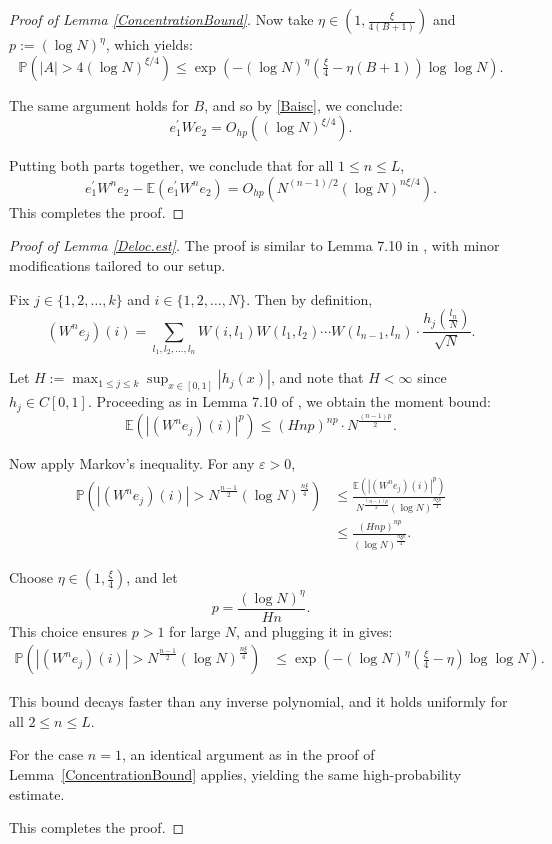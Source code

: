 \documentclass[11pt, reqno]{amsart}
\numberwithin{equation}{section}
\begin{document}
\begin{proof}[Proof of Lemma \ref{ConcentrationBound}]
Now take \( \eta \in \left(1, \frac{\xi}{4(B+1)}\right) \) and \( p := (\log N)^{\eta} \), which yields:
\[
\mathbb{P}(|A| > 4(\log N)^{\xi/4}) \le \exp\left( - (\log N)^{\eta} (\tfrac{\xi}{4} - \eta(B+1)) \log \log N \right).
\]

The same argument holds for \( B \), and so by \eqref{Baisc}, we conclude:
\[
e_1^\prime W e_2 = O_{hp}((\log N)^{\xi/4}).
\]

Putting both parts together, we conclude that for all \( 1 \le n \le L \),
\[
e_1^\prime W^n e_2 - \mathbb{E}(e_1^\prime W^n e_2) = O_{hp}\left( N^{(n-1)/2} (\log N)^{n\xi/4} \right).
\]
This completes the proof.
\end{proof}


\begin{proof}[Proof of Lemma \ref{Deloc.est}]
The proof is similar to Lemma 7.10 in \cite{erdHos2013spectral}, with minor modifications tailored to our setup.

Fix \( j \in \{1,2,\ldots,k\} \) and \( i \in \{1,2,\ldots,N\} \). Then by definition,
\[
(W^n e_j)(i) = \sum_{l_1, l_2, \ldots, l_n} W(i, l_1) W(l_1, l_2) \cdots W(l_{n-1}, l_n) \cdot \frac{h_j\left(\frac{l_n}{N}\right)}{\sqrt{N}}.
\]

Let \( H := \max_{1 \le j \le k} \sup_{x \in [0,1]} |h_j(x)| \), and note that \( H < \infty \) since \( h_j \in C[0,1] \). Proceeding as in Lemma 7.10 of \cite{erdHos2013spectral}, we obtain the moment bound:
\[
\mathbb{E}\left( |(W^n e_j)(i)|^p \right) \le (H n p)^{n p} \cdot N^{\frac{(n-1)p}{2}}.
\]

Now apply Markov's inequality. For any \( \varepsilon > 0 \),
\begin{align*}
\mathbb{P}\left( |(W^n e_j)(i)| > N^{\frac{n-1}{2}} (\log N)^{\frac{n\xi}{4}} \right) 
&\le \frac{ \mathbb{E} \left( |(W^n e_j)(i)|^p \right) }{ N^{\frac{(n-1)p}{2}} (\log N)^{\frac{n\xi p}{4}} } \\
&\le \frac{ (H n p)^{n p} }{ (\log N)^{\frac{n \xi p}{4}} }.
\end{align*}

Choose \( \eta \in \left(1, \frac{\xi}{4} \right) \), and let
\[
p = \frac{ (\log N)^\eta }{H n }.
\]
This choice ensures \( p > 1 \) for large \( N \), and plugging it in gives:
\begin{align*}
\mathbb{P}\left( |(W^n e_j)(i)| > N^{\frac{n-1}{2}} (\log N)^{\frac{n\xi}{4}} \right)
&\le \exp\left( - (\log N)^\eta \left( \frac{\xi}{4} - \eta \right) \log \log N \right).
\end{align*}

This bound decays faster than any inverse polynomial, and it holds uniformly for all \( 2 \le n \le L \).

For the case \( n = 1 \), an identical argument as in the proof of Lemma~\ref{ConcentrationBound} applies, yielding the same high-probability estimate.

\smallskip
This completes the proof.
\end{proof}
\end{document}
